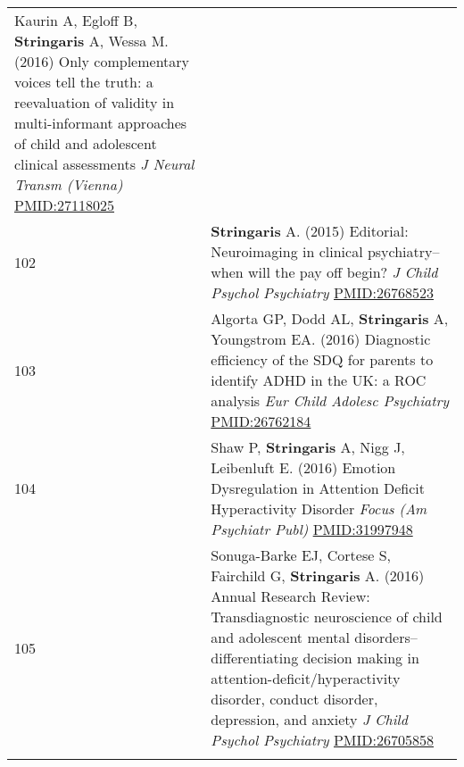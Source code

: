 \documentclass[
]{article}
\begin{document}
\begin{longtable}[]{@{}ll@{}}
\begin{minipage}[t]{0.94\columnwidth}
Kaurin A, Egloff B, \textbf{Stringaris} A, Wessa M. (2016) Only
complementary voices tell the truth: a reevaluation of validity in
multi-informant approaches of child and adolescent clinical assessments
\emph{J Neural Transm (Vienna)} \url{PMID:27118025}\strut
\end{minipage}\tabularnewline
\begin{minipage}[t]{0.01\columnwidth}\raggedright
102\strut
\end{minipage} & \begin{minipage}[t]{0.94\columnwidth}\raggedright
\textbf{Stringaris} A. (2015) Editorial: Neuroimaging in clinical
psychiatry--when will the pay off begin? \emph{J Child Psychol
Psychiatry} \url{PMID:26768523}\strut
\end{minipage}\tabularnewline
\begin{minipage}[t]{0.01\columnwidth}\raggedright
103\strut
\end{minipage} & \begin{minipage}[t]{0.94\columnwidth}\raggedright
Algorta GP, Dodd AL, \textbf{Stringaris} A, Youngstrom EA. (2016)
Diagnostic efficiency of the SDQ for parents to identify ADHD in the UK:
a ROC analysis \emph{Eur Child Adolesc Psychiatry}
\url{PMID:26762184}\strut
\end{minipage}\tabularnewline
\begin{minipage}[t]{0.01\columnwidth}\raggedright
104\strut
\end{minipage} & \begin{minipage}[t]{0.94\columnwidth}\raggedright
Shaw P, \textbf{Stringaris} A, Nigg J, Leibenluft E. (2016) Emotion
Dysregulation in Attention Deficit Hyperactivity Disorder \emph{Focus
(Am Psychiatr Publ)} \url{PMID:31997948}\strut
\end{minipage}\tabularnewline
\begin{minipage}[t]{0.01\columnwidth}\raggedright
105\strut
\end{minipage} & \begin{minipage}[t]{0.94\columnwidth}\raggedright
Sonuga-Barke EJ, Cortese S, Fairchild G, \textbf{Stringaris} A. (2016)
Annual Research Review: Transdiagnostic neuroscience of child and
adolescent mental disorders--differentiating decision making in
attention-deficit/hyperactivity disorder, conduct disorder, depression,
and anxiety \emph{J Child Psychol Psychiatry} \url{PMID:26705858}\strut
\end{minipage}\tabularnewline
\begin{minipage}[t]{0.01\columnwidth}\raggedright

\end{minipage}
\end{longtable}
\end{document}
